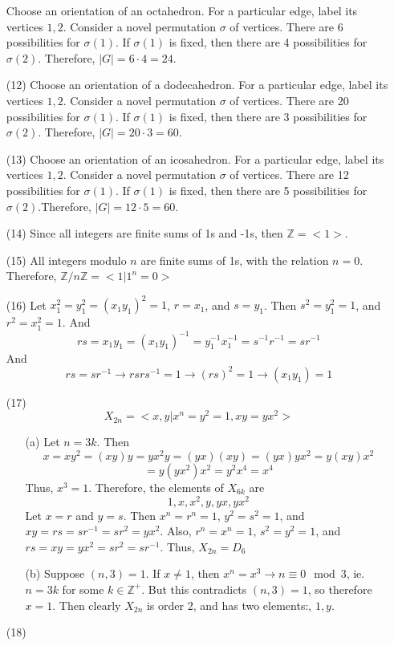 \documentclass[12pt]{article}
\begin{document}
\begin{itemize}
Choose an orientation of an octahedron. For a particular edge, label its vertices $1, 2$. Consider a novel permutation $\sigma$ of vertices. There are 6 possibilities for $\sigma(1)$. If $\sigma(1)$ is fixed, then there are 4 possibilities for $\sigma(2)$. Therefore, $|G| = 6 \cdot 4 = 24$. 
\item[(12)]
Choose an orientation of a dodecahedron. For a particular edge, label its vertices $1, 2$. Consider a novel permutation $\sigma$ of vertices. There are 20 possibilities for $\sigma(1)$. If $\sigma(1)$ is fixed, then there are 3 possibilities for $\sigma(2)$. Therefore, $|G| = 20 \cdot 3 = 60$. 
\item[(13)]
Choose an orientation of an icosahedron. For a particular edge, label its vertices $1, 2$. Consider a novel permutation $\sigma$ of vertices. There are 12 possibilities for $\sigma(1)$. If $\sigma(1)$ is fixed, then there are 5 possibilities for $\sigma(2)$.Therefore, $|G| = 12 \cdot 5 = 60$.
\item[(14)]
Since all integers are finite sums of 1s and -1s, then $\mathbb{Z} = <1>$.
\item[(15)]
All integers modulo $n$ are finite sums of 1s, with the relation $n = 0$. Therefore, $\mathbb{Z}/n\mathbb{Z} = <1 | 1^n = 0>$
\item[(16)]
Let $x_1^2 = y_1^2 = (x_1y_1)^2 = 1$, $r = x_1$, and $s = y_1$. Then $s^2 = y_1^2 = 1$, and $r^2 = x_1^2 = 1$. And 
$$rs = x_1y_1 = (x_1y_1)^{-1} = y_1^{-1}x_1^{-1} = s^{-1}r^{-1} = sr^{-1}$$
And
$$rs = sr^{-1} \rightarrow rsrs^{-1} = 1 \rightarrow (rs)^2 = 1 \rightarrow (x_1y_1) = 1$$
\item[(17)]
$$X_{2n} = < x, y | x^n = y^2 = 1, xy = yx^2 >$$
\begin{itemize}
\item[(a)]
Let $n = 3k$. Then
$$x = xy^2 = (xy)y = yx^2y = (yx)(xy) = (yx)yx^2 = y(xy)x^2$$
$$= y(yx^2)x^2 = y^2x^4 = x^4$$
Thus, $x^3 = 1$. Therefore, the elements of $X_{6k}$ are
$$1, x, x^2, y, yx, yx^2$$
Let $x = r$ and $y = s$. Then $x^n = r^n = 1$, $y^2 = s^2 = 1$, and $xy = rs = sr^{-1} = sr^2 = yx^2$. Also, $r^n = x^n = 1$, $s^2 = y^2 = 1$, and $rs = xy = yx^2 = sr^2 = sr^{-1}$. Thus, $X_{2n} = D_{6}$
\item[(b)]
Suppose $(n, 3) = 1$. If $x \neq 1$, then $x^n = x^3 \rightarrow n \equiv 0 \mod 3$, ie. $n = 3k$ for some $k \in \mathbb{Z}^+$. But this contradicts $(n, 3) = 1$, so therefore $x = 1$. Then clearly $X_{2n}$ is order 2, and has two elements:, $1, y$.
\end{itemize}
\item[(18)]

\end{itemize}
\end{document}
